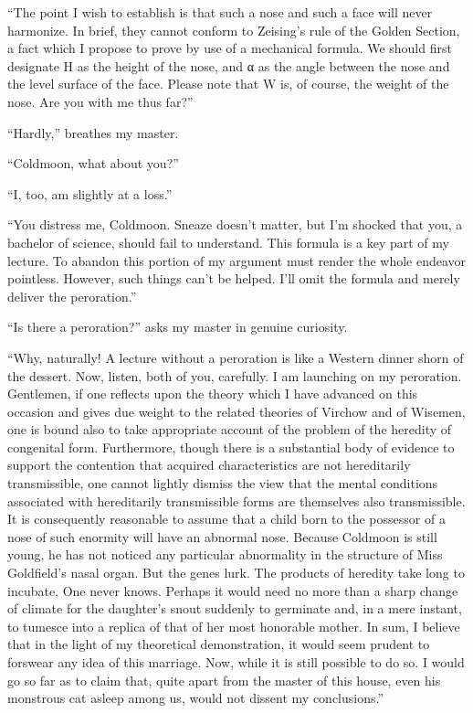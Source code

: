\documentclass{book}
\begin{document}
``The point I wish to establish is that such a nose and such a face will
never harmonize. In brief, they cannot conform to Zeising's rule of the
Golden Section, a fact which I propose to prove by use of a mechanical
formula. We should first designate H as the height of the nose, and α as
the angle between the nose and the level surface of the face. Please
note that W is, of course, the weight of the nose. Are you with me thus
far?''

``Hardly,'' breathes my master.

``Coldmoon, what about you?''

``I, too, am slightly at a loss.''

``You distress me, Coldmoon. Sneaze doesn't matter, but I'm shocked that
you, a bachelor of science, should fail to understand. This formula is a
key part of my lecture. To abandon this portion of my argument must
render the whole endeavor pointless. However, such things can't be
helped. I'll omit the formula and merely deliver the peroration.''

``Is there a peroration?'' asks my master in genuine curiosity.

``Why, naturally! A lecture without a peroration is like a Western
dinner shorn of the dessert. Now, listen, both of you, carefully. I am
launching on my peroration. Gentlemen, if one reflects upon the theory
which I have advanced on this occasion and gives due weight to the
related theories of Virchow and of Wisemen, one is bound also to take
appropriate account of the problem of the heredity of congenital form.
Furthermore, though there is a substantial body of evidence to support
the contention that acquired characteristics are not hereditarily
transmissible, one cannot lightly dismiss the view that the mental
conditions associated with hereditarily transmissible forms are
themselves also transmissible. It is consequently reasonable to assume
that a child born to the possessor of a nose of such enormity will have
an abnormal nose. Because Coldmoon is still young, he has not noticed
any particular abnormality in the structure of Miss Goldfield's nasal
organ. But the genes lurk. The products of heredity take long to
incubate. One never knows. Perhaps it would need no more than a sharp
change of climate for the daughter's snout suddenly to germinate and, in
a mere instant, to tumesce into a replica of that of her most honorable
mother. In sum, I believe that in the light of my theoretical
demonstration, it would seem prudent to forswear any idea of this
marriage. Now, while it is still possible to do so. I would go so far as
to claim that, quite apart from the master of this house, even his
monstrous cat asleep among us, would not dissent my conclusions.''
\end{document}
